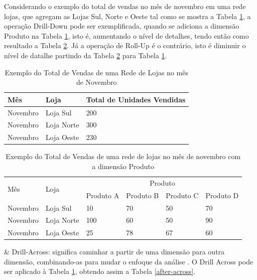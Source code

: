 Considerando o exemplo do total de vendas no mês de novembro em uma rede lojas, que agregam as Lojas Sul, Norte e Oeste tal como se mostra a Tabela \ref{before}, a operação Drill-Down pode ser exemplificada, quando se adiciona a dimensão Produto na Tabela \ref{before}, isto é, aumentando o nível de detalhes, tendo então como resultado a Tabela \ref{after}. Já a operação de Roll-Up é o contrário, isto é diminuir o nível de datalhe partindo da Tabela 
\ref{after} para Tabela \ref{before}.

\begin{table}[!ht]
\centering
\begin{tabular}{|l|l|l|}
\hline
Mês & Loja & Total de Unidades Vendidas \\ \hline
Novembro & Loja Sul & 200                        \\ \hline
Novembro & Loja Norte & 300                        \\ \hline
Novembro & Loja Oeste & 230                        \\ \hline
\end{tabular}
\caption{Exemplo do Total de Vendas de uma Rede de Lojas no mês de Novembro}
\label{before}
\end{table}
\FloatBarrier


\begin{table}[!ht]
\centering
\begin{tabular}{|l|l|l|l|l|l|}
\hline
\multirow{2}{*}{Mês} & \multirow{2}{*}{Loja} & \multicolumn{4}{c|}{Produto}                 \\ \cline{3-6} 
                     &                       & Produto A & Produto B & Produto C & Produto D \\ \hline
Novembro             & Loja Sul              & 10        & 70        & 50        & 70        \\ \hline
Novembro             & Loja Norte            & 100       & 60        & 50        & 90        \\ \hline
Novembro             & Loja Oeste            & 25        & 78        & 67        & 60        \\ \hline
\end{tabular}
\caption{Exemplo do Total de Vendas de uma rede de lojas no mês de novembro com a dimensão Produto}
\label{after}
\end{table}

\begin{easylist}[itemize]

& Drill-Across: significa caminhar a partir de uma dimensão para
outra dimensão, combinando-as para mudar o enfoque da
análise \cite{andre2000}. O Drill Across pode ser aplicado à Tabela \ref{before}, obtendo assim a Tabela \ref{after-across}.
\end{easylist}

